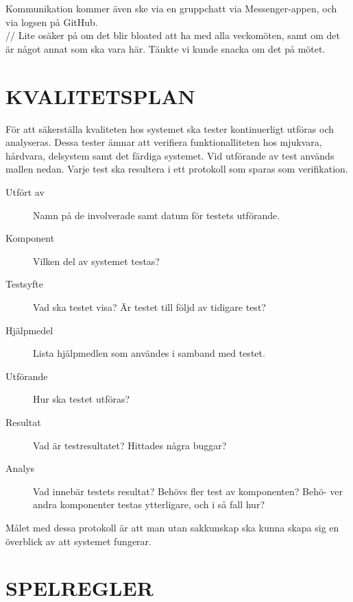 \documentclass[a4paper]{article}
\begin{document}
\\ \\
Kommunikation kommer även ske via en gruppchatt via Messenger-appen, och via logsen på GitHub.
\\
// Lite osäker på om det blir bloated att ha med alla veckomöten, samt om det är något annat som ska vara här.
Tänkte vi kunde snacka om det på mötet.

\section{KVALITETSPLAN}
\label{sec:kval}

För att säkerställa kvaliteten hos systemet ska tester kontinuerligt utföras och analyseras. Dessa tester ämnar att verifiera funktionalliteten hos mjukvara, hårdvara, delsystem samt det färdiga systemet. Vid utförande av test används mallen nedan. Varje test ska resultera i ett protokoll som sparas som verifikation.

\begin{description}
	\item[Utfört av] Namn på de involverade samt datum för testets utförande.

	\item[Komponent] Vilken del av systemet testas?

	\item[Testsyfte] Vad ska testet visa? Är testet till följd av tidigare test?

	\item[Hjälpmedel] Lista hjälpmedlen som användes i samband med testet.

	\item[Utförande] Hur ska testet utföras?

	\item[Resultat] Vad är testresultatet? Hittades några buggar?

	\item[Analys] Vad innebär testets resultat? Behövs fler test av komponenten? Behö-
	ver andra komponenter testas ytterligare, och i så fall hur?
\end{description}

Målet med dessa protokoll är att man utan sakkunskap ska kunna skapa sig en överblick av att systemet fungerar.

\section{SPELREGLER}
\label{sec:spelregler}
\end{document}
